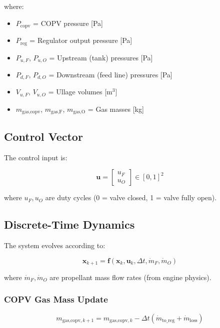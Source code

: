 \documentclass[11pt,a4paper]{article}
\begin{document}
where:
\begin{itemize}
    \item $P_{\text{copv}}$ = COPV pressure [Pa]
    \item $P_{\text{reg}}$ = Regulator output pressure [Pa]
    \item $P_{u,F}$, $P_{u,O}$ = Upstream (tank) pressures [Pa]
    \item $P_{d,F}$, $P_{d,O}$ = Downstream (feed line) pressures [Pa]
    \item $V_{u,F}$, $V_{u,O}$ = Ullage volumes [m$^3$]
    \item $m_{\text{gas,copv}}$, $m_{\text{gas,F}}$, $m_{\text{gas,O}}$ = Gas masses [kg]
\end{itemize}

\subsection{Control Vector}

The control input is:

\begin{equation}
\mathbf{u} = \begin{bmatrix}
u_F \\
u_O
\end{bmatrix} \in [0,1]^2
\end{equation}

where $u_F, u_O$ are duty cycles (0 = valve closed, 1 = valve fully open).

\subsection{Discrete-Time Dynamics}

The system evolves according to:

\begin{equation}
\mathbf{x}_{k+1} = \mathbf{f}(\mathbf{x}_k, \mathbf{u}_k, \Delta t, \dot{m}_F, \dot{m}_O)
\end{equation}

where $\dot{m}_F, \dot{m}_O$ are propellant mass flow rates (from engine physics).

\subsubsection{COPV Gas Mass Update}

\begin{equation}
m_{\text{gas,copv},k+1} = m_{\text{gas,copv},k} - \Delta t \left(\dot{m}_{\text{to\_reg}} + \dot{m}_{\text{loss}}\right)
\end{equation}
\end{document}
